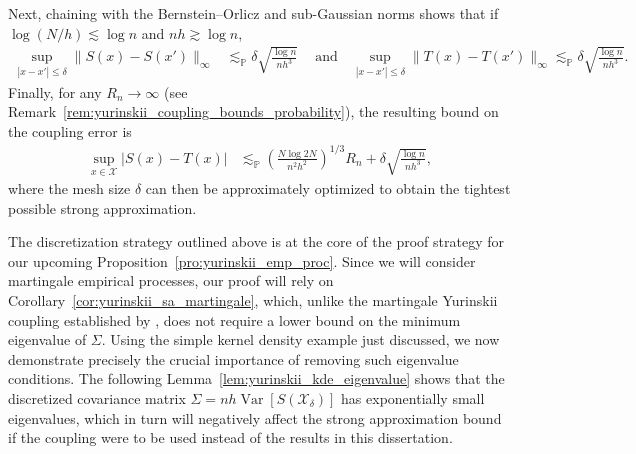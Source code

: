 \documentclass[11pt,lof]{puthesis}
\renewcommand{\P}{\ensuremath{\mathbb{P}}}
\newcommand{\cX}{\ensuremath{\mathcal{X}}}
\DeclareMathOperator{\Var}{Var}
\theoremstyle{break}
\theoremstyle{proof}
\begin{document}
Next, chaining with the Bernstein--Orlicz and sub-Gaussian norms
\citep[Section~2.2]{van1996weak} shows that if
$\log(N/h) \lesssim \log n$ and $n h \gtrsim \log n$,
%
\begin{align*}
\sup_{|x-x'| \leq \delta}
\big\|S(x) - S(x') \big\|_\infty
&\lesssim_\P
\delta
\sqrt{\frac{\log n}{n h^3}} \ \quad\text{and}\quad
\sup_{|x-x'| \leq \delta}
\big\|T(x) - T(x')\big\|_\infty
\lesssim_\P
\delta
\sqrt{\frac{\log n}{n h^3}}.
\end{align*}
%
Finally, for any $R_n\to\infty$
(see Remark~\ref{rem:yurinskii_coupling_bounds_probability}),
the resulting bound on the coupling error is
%
\begin{align*}
\sup_{x \in \cX}
\big| S(x) - T(x) \big|
&\lesssim_\P
\left( \frac{N \log 2N}{n^2 h^2} \right)^{1/3} R_n
+ \delta \sqrt{\frac{\log n}{n h^3}},
\end{align*}
%
where the mesh size $\delta$ can then be approximately
optimized to obtain the tightest possible strong approximation.

The discretization strategy outlined above is at the core of the proof strategy
for our upcoming Proposition~\ref{pro:yurinskii_emp_proc}. Since we will
consider
martingale empirical processes, our proof will rely on
Corollary~\ref{cor:yurinskii_sa_martingale}, which, unlike the martingale
Yurinskii
coupling established by \citet{li2020uniform}, does not require a lower bound
on the minimum eigenvalue of $\Sigma$. Using the simple kernel density example
just discussed, we now demonstrate precisely the crucial importance of removing
such eigenvalue conditions. The following
Lemma~\ref{lem:yurinskii_kde_eigenvalue} shows
that the discretized covariance matrix $\Sigma = n h\Var[S(\cX_\delta)]$ has
exponentially small eigenvalues, which in turn will negatively affect the
strong approximation bound if the \citet{li2020uniform} coupling were to be
used instead of the results in this dissertation.
\end{document}
